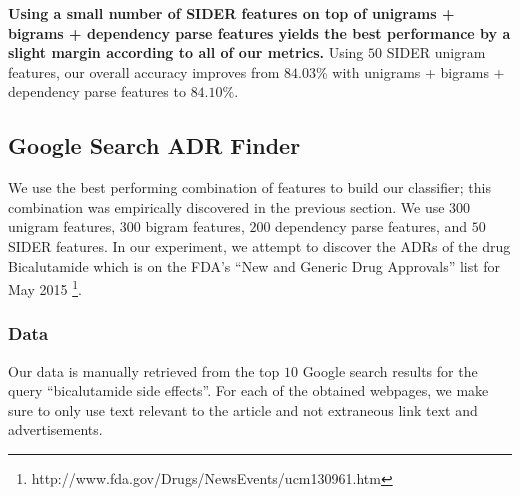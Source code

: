 \documentclass{acm_proc_article-sp}
\begin{document}
\textbf{Using a small number of SIDER features on top of unigrams + bigrams + dependency parse features yields the best performance by a slight margin according to all of our metrics.} Using $50$ SIDER unigram features, our overall accuracy improves from $84.03\%$ with unigrams + bigrams + dependency parse features to $84.10\%$.

\subsection{Google Search ADR Finder}
We use the best performing combination of features to build our classifier; this combination was empirically discovered in the previous section. We use $300$ unigram features, $300$ bigram features, $200$ dependency parse features, and $50$ SIDER features. In our experiment, we attempt to discover the ADRs of the drug Bicalutamide which is on the FDA's ``New and Generic Drug Approvals'' list for May 2015 \footnote{http://www.fda.gov/Drugs/NewsEvents/ucm130961.htm}.

\subsubsection{Data}
Our data is manually retrieved from the top $10$ Google search results for the query ``bicalutamide side effects''. For each of the obtained webpages, we make sure to only use text relevant to the article and not extraneous link text and advertisements.  
\end{document}
